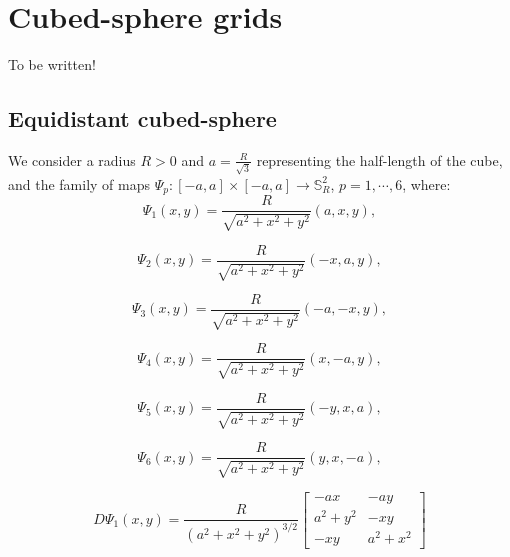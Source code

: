\chapter{Cubed-sphere grids}
\label{chp-cs-grids}
\citep{sadourny:1972}
\citep{ronchi:1996}
\citep{rancic:1996}
\citep{taylor:1997}
\citep{nair:2005}
\citep{lauritzen:2011}

To be written!
\section{Equidistant cubed-sphere}
\label{equidistant-cs}
We consider a radius $R>0$ and
$a = \frac{R}{\sqrt{3}}$ representing the half-length of 
the cube, and the family of maps
$\Psi_{p}: [-a,a] \times [-a,a] \to \mathbb{S}^2_R$, $p=1, \cdots, 6$,
where:
\begin{equation}
	\label{chp3-eqdistant-psi1}
	\Psi_{1}(x,y) = \frac{R}{\sqrt{a^2 + x^2 + y^2}}(a, x, y), 
\end{equation}

\begin{equation}
	\label{chp3-eqdistant-psi2}
	\Psi_{2}(x,y) = \frac{R}{\sqrt{a^2 + x^2 + y^2}}(-x, a, y), 
\end{equation}

\begin{equation}
	\label{chp3-eqdistant-psi3}
	\Psi_{3}(x,y) = \frac{R}{\sqrt{a^2 + x^2 + y^2}}(-a, -x, y), 
\end{equation}

\begin{equation}
	\label{chp3-eqdistant-psi4}
	\Psi_{4}(x,y) = \frac{R}{\sqrt{a^2 + x^2 + y^2}}(x, -a, y), 
\end{equation}

\begin{equation}
	\label{chp3-eqdistant-psi5}
	\Psi_{5}(x,y) = \frac{R}{\sqrt{a^2 + x^2 + y^2}}(-y, x, a), 
\end{equation}

\begin{equation}
	\label{chp3-eqdistant-psi6}
	\Psi_{6}(x,y) = \frac{R}{\sqrt{a^2 + x^2 + y^2}}(y, x, -a), 
\end{equation}

\begin{equation}
	\label{chp3-eqdistant-dpsi1}
	D\Psi_{1}(x,y) = \frac{R}{{(a^2 + x^2 + y^2)}^{3/2}}
	\begin{bmatrix}
		-ax & -ay \\
	 	 a^2+y^2  & -xy \\
		 -xy  & a^2+x^2
	\end{bmatrix}
\end{equation}

